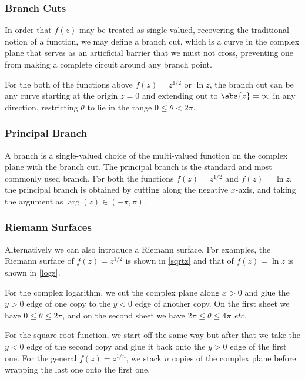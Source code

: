 \documentclass[english,a4paper,12pt]{report}
\begin{document}
\subsubsection{Branch Cuts}

In order that \(f(z)\) may be treated as single-valued, recovering the traditional notion of a function, we may define a branch cut, which is a curve in the complex plane that serves as an articficial barrier that we must not cross, preventing one from making a complete circuit around any branch point. 

For the both of the functions above \(f(z) = z^{1/2} \text { or } \ln z\), the branch cut can be any curve starting at the origin \(z = 0\) and extending out to \(\abs{z} = \infty \) in any direction, restricting \(\theta \) to lie in the range \(0 \le \theta <2\pi \).

\subsubsection{Principal Branch}

A branch is a single-valued choice of the multi-valued function on the complex plane with the branch cut. The principal branch is the standard and most commonly used branch. For both the functions \(f(z) = z^{1 /2} \text { and }  f(z) = \ln z \), the principal branch is obtained by cutting along the negative \(x\)-axis, and taking the argument as \(\arg (z) \in (-\pi ,\pi )\).   

\subsubsection{Riemann Surfaces}

Alternatively we can also introduce a Riemann surface. For examples, the Riemann surface of \(f(z) = z^{1 /2} \) is shown in \cref{sqrtz} and that of \(f(z) = \ln z\) is shown in \cref{logz}.

For the complex logarithm, we cut the complex plane along \(x > 0\) and glue the \(y > 0\) edge of one copy to the \(y <0\) edge of another copy. On the first sheet we have \(0 \le \theta \le 2\pi \), and on the second sheet we have \(2\pi \le \theta \le 4\pi \) \textit{etc.} 

For the square root function, we start off the same way but after that we take the \(y<0\) edge of the second copy and glue it back onto the \(y >0\) edge of the first one. For the general \(f(z) = z^{ 1/n} \), we stack \(n\) copies of the complex plane before wrapping the last one onto the first one.   
\end{document}
